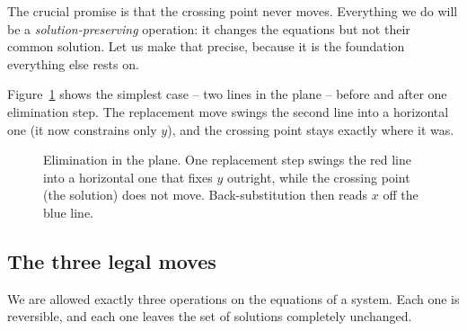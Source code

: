 The crucial promise is that the crossing point never moves. Everything we do
will be a \emph{solution-preserving} operation: it changes the equations but not
their common solution. Let us make that precise, because it is the foundation
everything else rests on.

Figure~\ref{ch07:two-lines} shows the simplest case -- two lines in the plane --
before and after one elimination step. The replacement move swings the second
line into a horizontal one (it now constrains only $y$), and the crossing point
stays exactly where it was.

\begin{figure}[H]
\centering
{}
\caption{Elimination in the plane. One replacement step swings the red line into
a horizontal one that fixes $y$ outright, while the crossing point (the solution)
does not move. Back-substitution then reads $x$ off the blue line.}
\label{ch07:two-lines}
\end{figure}

\subsection{The three legal moves}

We are allowed exactly three operations on the equations of a system. Each one
is reversible, and each one leaves the set of solutions completely unchanged.

